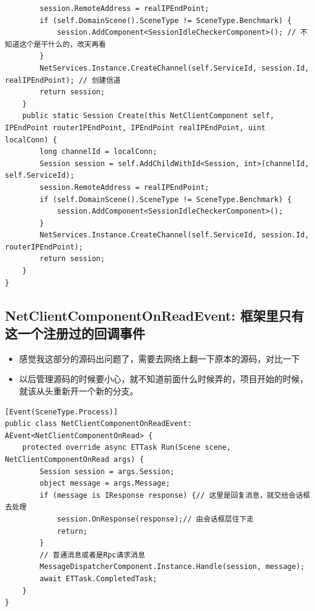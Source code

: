 \documentclass[9pt, b5paper]{article}
\begin{document}
\begin{verbatim}
        session.RemoteAddress = realIPEndPoint;
        if (self.DomainScene().SceneType != SceneType.Benchmark) {
            session.AddComponent<SessionIdleCheckerComponent>(); // 不知道这个是干什么的，改天再看
        }
        NetServices.Instance.CreateChannel(self.ServiceId, session.Id, realIPEndPoint); // 创建信道
        return session;
    }
    public static Session Create(this NetClientComponent self, IPEndPoint routerIPEndPoint, IPEndPoint realIPEndPoint, uint localConn) {
        long channelId = localConn;
        Session session = self.AddChildWithId<Session, int>(channelId, self.ServiceId);
        session.RemoteAddress = realIPEndPoint;
        if (self.DomainScene().SceneType != SceneType.Benchmark) {
            session.AddComponent<SessionIdleCheckerComponent>();
        }
        NetServices.Instance.CreateChannel(self.ServiceId, session.Id, routerIPEndPoint);
        return session;
    }
}
\end{verbatim}
\subsection{NetClientComponentOnReadEvent: 框架里只有这一个注册过的回调事件}
\label{sec-8-7}
\begin{itemize}
\item 感觉我这部分的源码出问题了，需要去网络上翻一下原本的源码，对比一下
\item 以后管理源码的时候要小心，就不知道前面什么时候弄的，项目开始的时候，就该从头重新开一个新的分支。
\end{itemize}
\begin{verbatim}
[Event(SceneType.Process)]
public class NetClientComponentOnReadEvent: AEvent<NetClientComponentOnRead> {
    protected override async ETTask Run(Scene scene, NetClientComponentOnRead args) {
        Session session = args.Session;
        object message = args.Message;
        if (message is IResponse response) {// 这里是回复消息，就交给会话框去处理
            session.OnResponse(response);// 由会话框层往下走
            return;
        }
        // 普通消息或者是Rpc请求消息
        MessageDispatcherComponent.Instance.Handle(session, message);
        await ETTask.CompletedTask;
    }
}
\end{verbatim}
\end{document}

